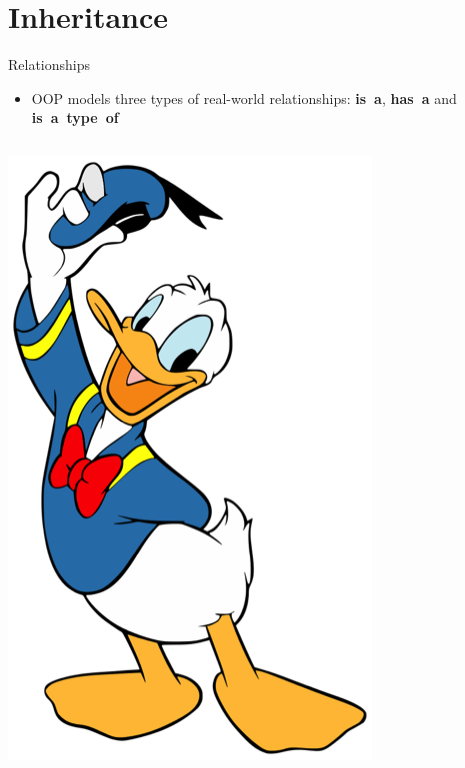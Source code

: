 \part{Inheritance}
\frame{\partpage}

\begin{frame}{Relationships}
	\begin{itemize}
		\pause\item OOP models three types of real-world relationships: \textbf{is~a}, \textbf{has~a} and \textbf{is~a~type~of}
	\end{itemize}
	\pause
	\begin{columns}
		\begin{column}{0.3\textwidth}
			\includegraphics[width=\textwidth]{donald.png}

\end{column}
\end{columns}
\end{frame}

